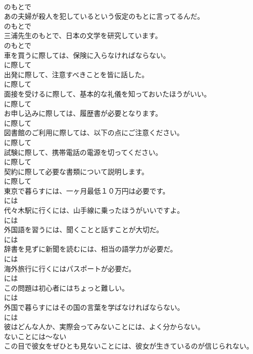 \documentclass[8pt]{extreport}
\begin{document}
\begin{CJK}{UTF8}{min}
\\	のもとで
\\	あの夫婦が殺人を犯しているという仮定のもとに言ってるんだ。	
\\	のもとで
\\	三浦先生のもとで、日本の文学を研究しています。	
\\	のもとで
\\	車を買うに際しては、保険に入らなければならない。	
\\	に際して
\\	出発に際して、注意すべきことを皆に話した。	
\\	に際して
\\	面接を受けるに際して、基本的な礼儀を知っておいたほうがいい。	
\\	に際して
\\	お申し込みに際しては、履歴書が必要となります。	
\\	に際して
\\	図書館のご利用に際しては、以下の点にご注意ください。	
\\	に際して
\\	試験に際して、携帯電話の電源を切ってください。	
\\	に際して
\\	契約に際して必要な書類について説明します。	
\\	に際して
\\	東京で暮らすには、一ヶ月最低１０万円は必要です。	
\\	には
\\	代々木駅に行くには、山手線に乗ったほうがいいですよ。	
\\	には
\\	外国語を習うには、聞くことと話すことが大切だ。	
\\	には
\\	辞書を見ずに新聞を読むには、相当の語学力が必要だ。	
\\	には
\\	海外旅行に行くにはパスポートが必要だ。	
\\	には
\\	この問題は初心者にはちょっと難しい。	
\\	には
\\	外国で暮らすにはその国の言葉を学ばなければならない。	
\\	には
\\	彼はどんな人か、実際会ってみないことには、よく分からない。	
\\	ないことには～ない
\\	この目で彼女をぜひとも見ないことには、彼女が生きているのが信じられない。	

\end{CJK}
\end{document}
